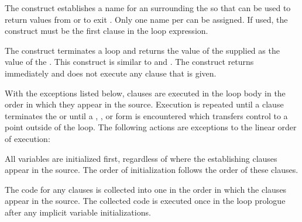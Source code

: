 

                                          
The  construct
establishes a name for an  surrounding the  so
that  can be used to return 
values from or to exit .   
Only one name per   can be assigned.
If used, the  construct must be the first clause in the loop expression.

The  construct terminates a 
loop and returns the value of 
the supplied  as the value of the 
.   This construct
is similar to  and .
 The  construct returns immediately 
and does not execute any  clause that is given.
                
\endlist 

\endsubsubsection%

 
  With the exceptions listed below, clauses are executed in the loop body
  in the order in which they appear in the source.  Execution is repeated 
  until a clause
  terminates the  or until a , ,
  or  form is encountered 
which transfers control to a point outside of the loop.
 The following actions are
  exceptions to the linear order of execution:
 
\beginlist

\itemitem{\bull}  All variables are initialized first, 
  regardless of where the establishing clauses appear in the
  source.  The order of initialization follows the order of these clauses.
                                    
\itemitem{\bull}  The code for any  clauses is collected
  into one  in the order in which the clauses appear in
  the source.  The collected code is executed once in the loop prologue
  after any implicit variable initializations.
 
